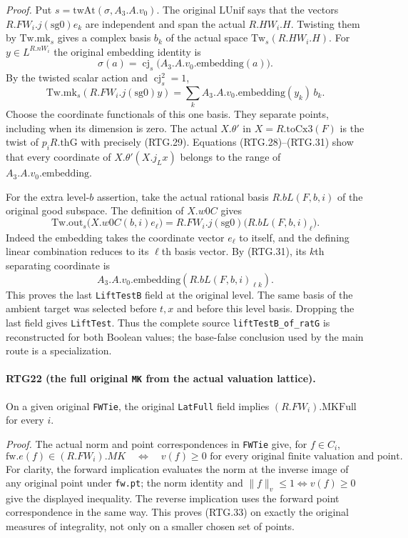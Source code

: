 \emph{Proof.}
Put $s=\mathrm{twAt}(\sigma,A_3.A.v_0)$.
The original $\mathrm{LUnif}$ says that the vectors
$R.FW_i.j(\mathrm{sg0})e_k$ are independent and span the actual
$R.HW_i.H$.  Twisting them by $\mathrm{Tw.mk}_s$ gives a complex
basis $b_k$ of the actual space $\mathrm{Tw}_s(R.HW_i.H)$.
For $y\in L^{R.nW_i}$ the original embedding identity is
\[
 \sigma(a)=\operatorname{cj}_s\bigl(A_3.A.v_0.\mathrm{embedding}(a)\bigr).
\]
By the twisted scalar action and $\operatorname{cj}_s^2=1$,
\[
 \mathrm{Tw.mk}_s(R.FW_i.j(\mathrm{sg0})y)
     =\sum_k A_3.A.v_0.\mathrm{embedding}(y_k)\,b_k.
                                                               \tag{RTG.31}
\]
Choose the coordinate functionals of this one basis.  They separate
points, including when its dimension is zero.  The actual
$X.\theta'$ in $X=R.\mathrm{toCx3}(F)$ is the twist of
$p_iR.\mathrm{thG}$ with precisely (RTG.29).  Equations
(RTG.28)--(RTG.31) show that every coordinate of
$X.\theta'(X.j_Lx)$ belongs to the range of
$A_3.A.v_0.\mathrm{embedding}$.

For the extra level-$b$ assertion, take the actual rational basis
$R.bL(F,b,i)$ of the original good subspace.  The definition of $X.w0C$
gives
\[
 \mathrm{Tw.out}_s\bigl(X.w0C(b,i)e_\ell\bigr)
       =R.FW_i.j(\mathrm{sg0})\bigl(R.bL(F,b,i)_\ell\bigr).
                                                               \tag{RTG.32}
\]
Indeed the embedding takes the coordinate vector $e_\ell$ to itself,
and the defining linear combination reduces to its $\ell$th basis
vector.  By (RTG.31), its $k$th separating coordinate is
\[
 A_3.A.v_0.\mathrm{embedding}(R.bL(F,b,i)_{\ell k}).
\]
This proves the last \texttt{LiftTestB} field at the original level.
The same basis of the ambient target was selected before $t,x$ and
before this level basis.  Dropping the last field gives
\texttt{LiftTest}.  Thus the complete source
\texttt{liftTestB\_\allowbreak of\_\allowbreak ratG} is reconstructed for both Boolean values;
the base-false conclusion used by the main route is a specialization.

\paragraph{RTG22 (the full original \texttt{MK} from the actual valuation lattice).}
\label{claim:RTG22}
On a given original \texttt{FWTie}, the original \texttt{LatFull}
field implies $(R.FW_i).\mathrm{MKFull}$ for every $i$.

\emph{Proof.}
The actual norm and point correspondences in \texttt{FWTie} give,
for $f\in C_i$,
\[
 \mathrm{fw}.e(f)\in(R.FW_i).MK
  \quad\Longleftrightarrow\quad
   v(f)\ge0\text{ for every original finite valuation and point}.
                                                               \tag{RTG.33}
\]
For clarity, the forward implication evaluates the norm at the inverse
image of any original point under \texttt{fw.pt}; the norm identity
and \(\|f\|_v\le1\iff v(f)\ge0\) give the displayed inequality.
The reverse implication uses the forward point correspondence in the
same way.  This proves (RTG.33) on exactly the original measures of
integrality, not only on a smaller chosen set of points.

